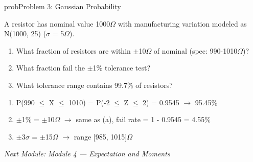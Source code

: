 \begin{PSbox}[unbreakable]{prob}{Problem 3: Gaussian Probability}

A resistor has nominal value 1000\ensuremath{\Omega} with manufacturing variation modeled as N(1000, 25) (\ensuremath{\sigma} = 5\ensuremath{\Omega}).

\begin{enumerate}
\def\labelenumi{(\alph{enumi})}
\tightlist
\item
  What fraction of resistors are within \ensuremath{\pm}10\ensuremath{\Omega} of nominal (spec: 990-1010\ensuremath{\Omega})?
\item
  What fraction fail the \ensuremath{\pm}1\% tolerance test?
\item
  What tolerance range contains 99.7\% of resistors?
\end{enumerate}

\PSsolution{} 

\begin{enumerate}
\def\labelenumi{(\alph{enumi})}
\tightlist
\item
  P(990 \ensuremath{\le} X \ensuremath{\le} 1010) = P(-2 \ensuremath{\le} Z \ensuremath{\le} 2) = 0.9545 \ensuremath{\to} 95.45\%
\item
  \ensuremath{\pm}1\% = \ensuremath{\pm}10\ensuremath{\Omega} \ensuremath{\to} same as (a), fail rate = 1 - 0.9545 = 4.55\%
\item
  \ensuremath{\pm}3\ensuremath{\sigma} = \ensuremath{\pm}15\ensuremath{\Omega} \ensuremath{\to} range [985, 1015]\ensuremath{\Omega}
\end{enumerate}

\emph{Next Module: {Module 4 — Expectation and Moments}}

\end{PSbox}
